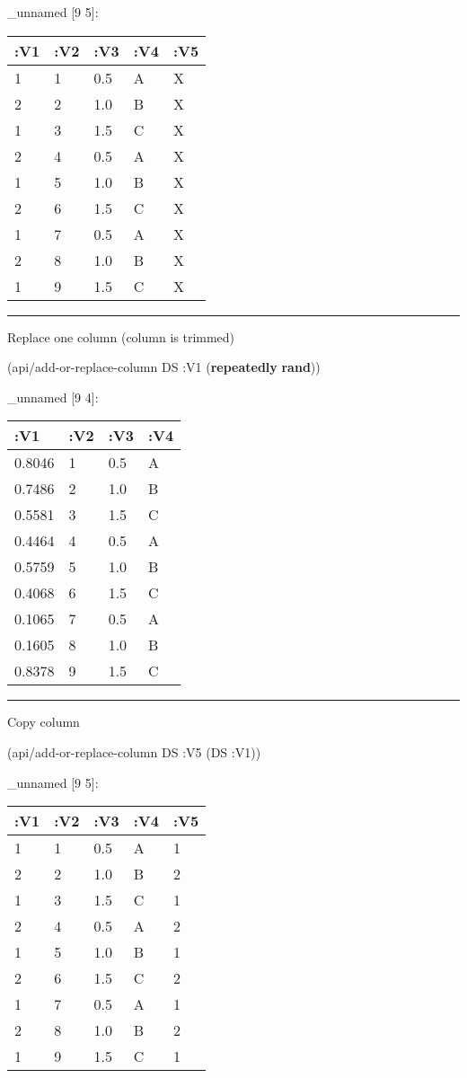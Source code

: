 \documentclass[]{article}
\newenvironment{Shaded}{\begin{snugshade}}{\end{snugshade}}
\newcommand{\AttributeTok}[1]{\textcolor[rgb]{0.77,0.63,0.00}{#1}}
\newcommand{\KeywordTok}[1]{\textcolor[rgb]{0.13,0.29,0.53}{\textbf{#1}}}
\newcommand{\NormalTok}[1]{#1}
\begin{document}
\_unnamed {[}9 5{]}:

\begin{longtable}[]{@{}lllll@{}}
\toprule
:V1 & :V2 & :V3 & :V4 & :V5\tabularnewline
\midrule
\endhead
1 & 1 & 0.5 & A & X\tabularnewline
2 & 2 & 1.0 & B & X\tabularnewline
1 & 3 & 1.5 & C & X\tabularnewline
2 & 4 & 0.5 & A & X\tabularnewline
1 & 5 & 1.0 & B & X\tabularnewline
2 & 6 & 1.5 & C & X\tabularnewline
1 & 7 & 0.5 & A & X\tabularnewline
2 & 8 & 1.0 & B & X\tabularnewline
1 & 9 & 1.5 & C & X\tabularnewline
\bottomrule
\end{longtable}

\begin{center}\rule{0.5\linewidth}{0.5pt}\end{center}

Replace one column (column is trimmed)

\begin{Shaded}
\begin{Highlighting}[]
\NormalTok{(api/add-or-replace-column DS }\AttributeTok{:V1}\NormalTok{ (}\KeywordTok{repeatedly} \KeywordTok{rand}\NormalTok{))}
\end{Highlighting}
\end{Shaded}

\_unnamed {[}9 4{]}:

\begin{longtable}[]{@{}llll@{}}
\toprule
:V1 & :V2 & :V3 & :V4\tabularnewline
\midrule
\endhead
0.8046 & 1 & 0.5 & A\tabularnewline
0.7486 & 2 & 1.0 & B\tabularnewline
0.5581 & 3 & 1.5 & C\tabularnewline
0.4464 & 4 & 0.5 & A\tabularnewline
0.5759 & 5 & 1.0 & B\tabularnewline
0.4068 & 6 & 1.5 & C\tabularnewline
0.1065 & 7 & 0.5 & A\tabularnewline
0.1605 & 8 & 1.0 & B\tabularnewline
0.8378 & 9 & 1.5 & C\tabularnewline
\bottomrule
\end{longtable}

\begin{center}\rule{0.5\linewidth}{0.5pt}\end{center}

Copy column

\begin{Shaded}
\begin{Highlighting}[]
\NormalTok{(api/add-or-replace-column DS }\AttributeTok{:V5}\NormalTok{ (DS }\AttributeTok{:V1}\NormalTok{))}
\end{Highlighting}
\end{Shaded}

\_unnamed {[}9 5{]}:

\begin{longtable}[]{@{}lllll@{}}
\toprule
:V1 & :V2 & :V3 & :V4 & :V5\tabularnewline
\midrule
\endhead
1 & 1 & 0.5 & A & 1\tabularnewline
2 & 2 & 1.0 & B & 2\tabularnewline
1 & 3 & 1.5 & C & 1\tabularnewline
2 & 4 & 0.5 & A & 2\tabularnewline
1 & 5 & 1.0 & B & 1\tabularnewline
2 & 6 & 1.5 & C & 2\tabularnewline
1 & 7 & 0.5 & A & 1\tabularnewline
2 & 8 & 1.0 & B & 2\tabularnewline
1 & 9 & 1.5 & C & 1\tabularnewline
\bottomrule
\end{longtable}
\end{document}

